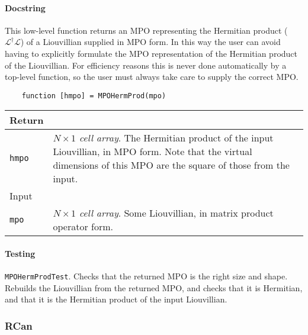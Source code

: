  \paragraph{Docstring} This low-level function returns an MPO representing the Hermitian product (\(\mathcal{L}^{\dagger}\mathcal{L}\)) of a Liouvillian supplied in MPO form. In this way the user can avoid having to explicitly formulate the MPO representation of the Hermitian product of the Liouvillian. For efficiency reasons this is never done automatically by a top-level function, so the user must always take care to supply the correct MPO.
 \begin{lstlisting}
 	function [hmpo] = MPOHermProd(mpo) \end{lstlisting}
 \begin{longtabu}{X[1,1]X[4,1]}
 \hline
 Return & \\ \hline
 \lstinline$hmpo$ & \emph{\(N \times 1\) cell array}. The Hermitian product of the input Liouvillian, in MPO form. Note that the virtual dimensions of this MPO are the square of those from the input. \\ \hline
 Input & \\ \hline
 \lstinline$mpo$ & \emph{\(N \times 1\) cell array}. Some Liouvillian, in matrix product operator form. \\ 
 \hline
 \end{longtabu}
 \paragraph{Testing} \lstinline$MPOHermProdTest$. Checks that the returned MPO is the right size and shape. Rebuilds the Liouvillian from the returned MPO, and checks that it is Hermitian, and that it is the Hermitian product of the input Liouvillian. 
 
 \subsubsection{RCan}
